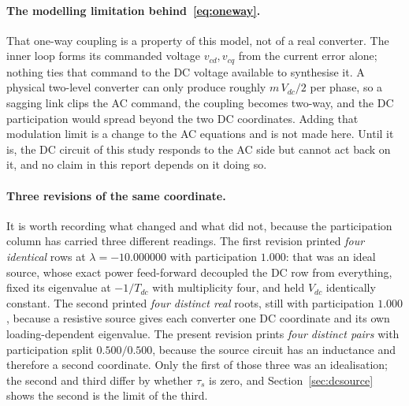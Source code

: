 \documentclass[12pt,a4paper]{article}
\theoremstyle{remark}
\begin{document}
\paragraph{The modelling limitation behind~\eqref{eq:oneway}.} That one-way
coupling is a property of this model, not of a real converter. The inner loop
forms its commanded voltage $v_{cd},v_{cq}$ from the current error alone; nothing
ties that command to the DC voltage available to synthesise it. A physical
two-level converter can only produce roughly $m\,V_{dc}/2$ per phase, so a
sagging link clips the AC command, the coupling becomes two-way, and the DC
participation would spread beyond the two DC coordinates. Adding that modulation
limit is a change to the AC equations and is not made here. Until it is, the DC
circuit of this study responds to the AC side but cannot act back on it, and no
claim in this report depends on it doing so.

\paragraph{Three revisions of the same coordinate.} It is worth recording what
changed and what did not, because the participation column has carried three
different readings. The first revision printed \emph{four identical} rows at
$\lambda=-10.000000$ with participation $1.000$: that was an ideal source, whose
exact power feed-forward decoupled the DC row from everything, fixed its
eigenvalue at $-1/T_{dc}$ with multiplicity four, and held $V_{dc}$ identically
constant. The second printed \emph{four distinct real} roots, still with
participation $1.000$, because a resistive source gives each converter one DC
coordinate and its own loading-dependent eigenvalue. The present revision prints
\emph{four distinct pairs} with participation split $0.500/0.500$, because the
source circuit has an inductance and therefore a second coordinate. Only the
first of those three was an idealisation; the second and third differ by whether
$\tau_s$ is zero, and Section~\ref{sec:dcsource} shows the second is the limit of
the third.
\end{document}

